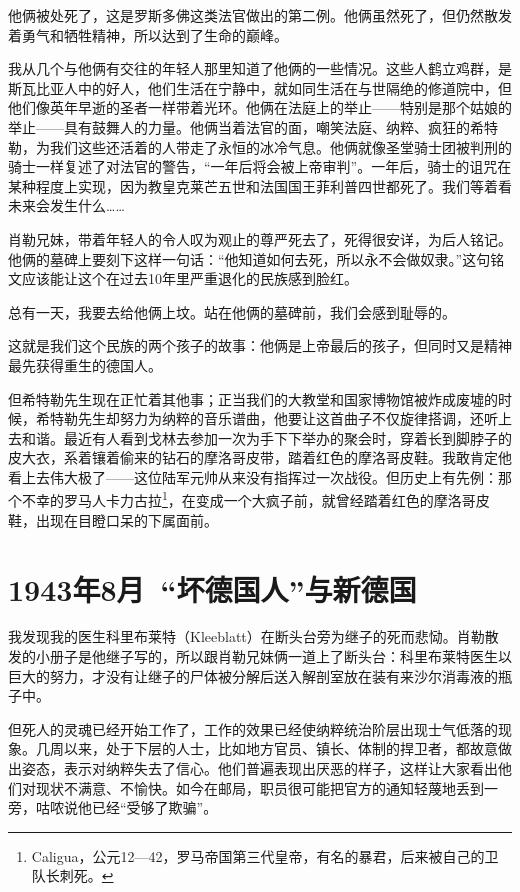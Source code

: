 \documentclass[UTF8]{ctexart}
\begin{document}
他俩被处死了，这是罗斯多佛这类法官做出的第二例。他俩虽然死了，但仍然散发着勇气和牺牲精神，所以达到了生命的巅峰。

我从几个与他俩有交往的年轻人那里知道了他俩的一些情况。这些人鹤立鸡群，是斯瓦比亚人中的好人，他们生活在宁静中，就如同生活在与世隔绝的修道院中，但他们像英年早逝的圣者一样带着光环。他俩在法庭上的举止——特别是那个姑娘的举止——具有鼓舞人的力量。他俩当着法官的面，嘲笑法庭、纳粹、疯狂的希特勒，为我们这些还活着的人带走了永恒的冰冷气息。他俩就像圣堂骑士团被判刑的骑士一样复述了对法官的警告，“一年后将会被上帝审判”。一年后，骑士的诅咒在某种程度上实现，因为教皇克莱芒五世和法国国王菲利普四世都死了。我们等着看未来会发生什么……

肖勒兄妹，带着年轻人的令人叹为观止的尊严死去了，死得很安详，为后人铭记。他俩的墓碑上要刻下这样一句话：“他知道如何去死，所以永不会做奴隶。”这句铭文应该能让这个在过去10年里严重退化的民族感到脸红。

总有一天，我要去给他俩上坟。站在他俩的墓碑前，我们会感到耻辱的。

这就是我们这个民族的两个孩子的故事：他俩是上帝最后的孩子，但同时又是精神最先获得重生的德国人。

但希特勒先生现在正忙着其他事；正当我们的大教堂和国家博物馆被炸成废墟的时候，希特勒先生却努力为纳粹的音乐谱曲，他要让这首曲子不仅旋律搭调，还听上去和谐。最近有人看到戈林去参加一次为手下下举办的聚会时，穿着长到脚脖子的皮大衣，系着镶着偷来的钻石的摩洛哥皮带，踏着红色的摩洛哥皮鞋。我敢肯定他看上去伟大极了——这位陆军元帅从来没有指挥过一次战役。但历史上有先例：那个不幸的罗马人卡力古拉\footnote{Caligua，公元12—42，罗马帝国第三代皇帝，有名的暴君，后来被自己的卫队长刺死。}，在变成一个大疯子前，就曾经踏着红色的摩洛哥皮鞋，出现在目瞪口呆的下属面前。

\section{1943年8月\ “坏德国人”与新德国}

我发现我的医生科里布莱特（Kleeblatt）在断头台旁为继子的死而悲恸。肖勒散发的小册子是他继子写的，所以跟肖勒兄妹俩一道上了断头台：科里布莱特医生以巨大的努力，才没有让继子的尸体被分解后送入解剖室放在装有来沙尔消毒液的瓶子中。

但死人的灵魂已经开始工作了，工作的效果已经使纳粹统治阶层出现士气低落的现象。几周以来，处于下层的人士，比如地方官员、镇长、体制的捍卫者，都故意做出姿态，表示对纳粹失去了信心。他们普遍表现出厌恶的样子，这样让大家看出他们对现状不满意、不愉快。如今在邮局，职员很可能把官方的通知轻蔑地丢到一旁，咕哝说他已经“受够了欺骗”。
\end{document}
